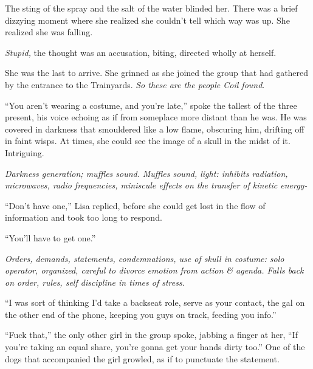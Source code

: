 {The sting of the spray and the salt of the water blinded her.  There was a brief dizzying moment where she realized she couldn't tell which way was up.  She realized she was falling.



\emph{Stupid, }the thought was an accusation, biting, directed wholly at herself.



\blacksquare



She was the last to arrive.  She grinned as she joined the group that had gathered by the entrance to the Trainyards.  \emph{So these are the people Coil found}.



``You aren't wearing a costume, and you're late,'' spoke the tallest of the three present, his voice echoing as if from someplace more distant than he was.  He was covered in darkness that smouldered like a low flame, obscuring him, drifting off in faint wisps.  At times, she could see the image of a skull in the midst of it.  Intriguing.



\emph{Darkness generation; muffles sound.}\emph{ Muffles sound, light: inhibits radiation, microwaves, radio frequencies, miniscule effects on the transfer of kinetic energy-}



``Don't have one,'' Lisa replied, before she could get lost in the flow of information and took too long to respond.



``You'll have to get one.''



\emph{Orders, demands, statements, condemnations, use of skull in costume: solo operator, organized, careful to divorce emotion from action & agenda.  Falls back on order, rules, self discipline in times of stress.}



``I was sort of thinking I'd take a backseat role, serve as your contact, the gal on the other end of the phone, keeping you guys on track, feeding you info.''



``Fuck that,'' the only other girl in the group spoke, jabbing a finger at her, ``If you're taking an equal share, you're gonna get your hands dirty too.''  One of the dogs that accompanied the girl growled, as if to punctuate the statement.



}
